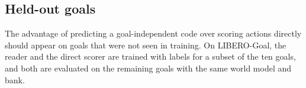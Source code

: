 \subsection{Held-out goals}
\label{sec:heldout}
The advantage of predicting a goal-independent code over scoring actions directly should appear on goals that were not seen in training.
On LIBERO-Goal, the reader and the direct scorer are trained with labels for a subset of the ten goals, and both are evaluated on the remaining goals with the same world model and bank.
